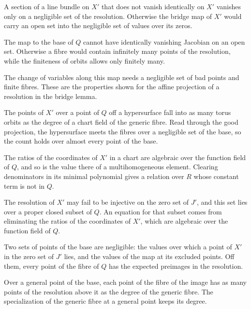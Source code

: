 A section of a line bundle on $X'$ that does not vanish identically on $X'$ vanishes only on a negligible set of the
resolution. Otherwise the bridge map of $X'$ would carry an open set into the negligible set of values over its zeros.

The map to the base of $Q$ cannot have identically vanishing Jacobian on an open set. Otherwise a fibre would contain
infinitely many points of the resolution, while the finiteness of orbits allows only finitely many.

The change of variables along this map needs a negligible set of bad points and finite fibres. These are the
properties shown for the affine projection of a resolution in the bridge lemma.

The points of $X'$ over a point of $Q$ off a hypersurface fall into as many torus orbits as the degree of a chart field of
the generic fibre. Read through the good projection, the hypersurface meets the fibres over a negligible set of the base,
so the count holds over almost every point of the base.

The ratios of the coordinates of $X'$ in a chart are algebraic over the function field of $Q$, and so is the value there
of a multihomogeneous element. Clearing denominators in its minimal polynomial gives a relation over $R$ whose constant
term is not in $Q$.

The resolution of $X'$ may fail to be injective on the zero set of $J'$, and this set lies over a proper closed subset of
$Q$. An equation for that subset comes from eliminating the ratios of the coordinates of $X'$, which are algebraic over
the function field of $Q$.

Two sets of points of the base are negligible: the values over which a point of $X'$ in the zero set of $J'$ lies, and
the values of the map at its excluded points. Off them, every point of the fibre of $Q$ has the expected preimages in the
resolution.

Over a general point of the base, each point of the fibre of the image has as many points of the resolution above it
as the degree of the generic fibre. The specialization of the generic fibre at a general point keeps its degree.

